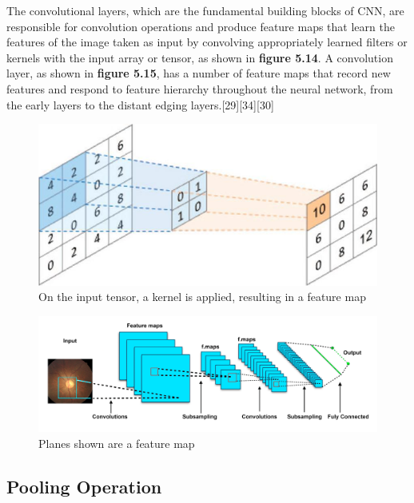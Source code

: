 \vspace{5mm}
The convolutional layers, which are the fundamental building blocks of CNN, are responsible for convolution operations and produce feature maps that learn the features of the image taken as input by convolving appropriately learned filters or kernels with the input array or tensor, as shown in \textbf{figure 5.14}. A convolution layer, as shown in \textbf{figure 5.15}, has a number of feature maps that record new features and respond to feature hierarchy throughout the neural network, from the early layers to the distant edging layers.[29][34][30]

\newpage
\vspace{5mm}
\begin{figure}[hbt!]
\centering
\includegraphics[scale=1]{images/fig-18.png}
\caption{On the input tensor, a kernel is applied, resulting in a feature map}
\label{fig:x On the input tensor, a kernel is applied, resulting in a feature map}
\end{figure}

\vspace{5mm}
\begin{figure}[hbt!]
\centering
\includegraphics[scale=0.5]{images/planes shown are a feature map.png}
\caption{Planes shown are a feature map}
\label{fig:x Planes shown are a feature map}
\end{figure}

\subsection{Pooling Operation}

